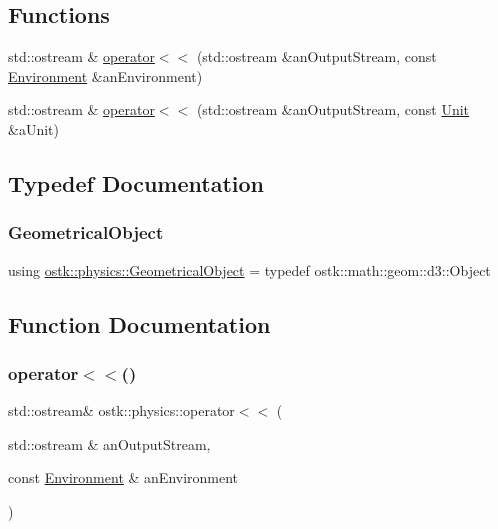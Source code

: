 \subsection*{Functions}
\begin{DoxyCompactItemize}
\item 
std\+::ostream \& \hyperlink{namespaceostk_1_1physics_af805fccec52bc16831bb68446cb96fde}{operator$<$$<$} (std\+::ostream \&an\+Output\+Stream, const \hyperlink{classostk_1_1physics_1_1_environment}{Environment} \&an\+Environment)
\item 
std\+::ostream \& \hyperlink{namespaceostk_1_1physics_a3c3e809ca069b393c79e7ad18cf0b24c}{operator$<$$<$} (std\+::ostream \&an\+Output\+Stream, const \hyperlink{classostk_1_1physics_1_1_unit}{Unit} \&a\+Unit)
\end{DoxyCompactItemize}


\subsection{Typedef Documentation}
\mbox{\label{namespaceostk_1_1physics_a4d67ab79697543f92030bbe07d5daac8}} 
\subsubsection{\texorpdfstring{Geometrical\+Object}{GeometricalObject}}
{\footnotesize\ttfamily using \hyperlink{namespaceostk_1_1physics_a4d67ab79697543f92030bbe07d5daac8}{ostk\+::physics\+::\+Geometrical\+Object} = typedef ostk\+::math\+::geom\+::d3\+::\+Object}



\subsection{Function Documentation}
\mbox{\label{namespaceostk_1_1physics_af805fccec52bc16831bb68446cb96fde}} 
\subsubsection{\texorpdfstring{operator$<$$<$()}{operator<<()}\hspace{0.1cm}{\footnotesize\ttfamily [1/2]}}
{\footnotesize\ttfamily std\+::ostream\& ostk\+::physics\+::operator$<$$<$ (\begin{DoxyParamCaption}\item[{std\+::ostream \&}]{an\+Output\+Stream,  }\item[{const \hyperlink{classostk_1_1physics_1_1_environment}{Environment} \&}]{an\+Environment }\end{DoxyParamCaption})}


